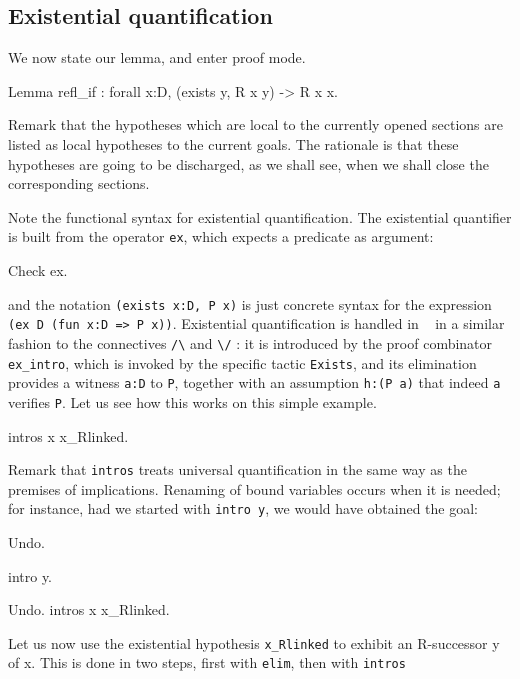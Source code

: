\documentclass[11pt,a4paper]{book}
\begin{document}
\subsection{Existential quantification}

We now state our lemma, and enter proof mode.
\begin{coq_example}
Lemma refl_if : forall x:D, (exists y, R x y) -> R x x.
\end{coq_example}

Remark that the hypotheses which are local to the currently opened sections
are listed as local hypotheses to the current goals.
The rationale is that these hypotheses are going to be discharged, as we
shall see, when we shall close the corresponding sections.

Note the functional syntax for existential quantification. The existential
quantifier is built from the operator \verb:ex:, which expects a 
predicate as argument:
\begin{coq_example}
Check ex.
\end{coq_example}
and the notation \verb+(exists x:D, P x)+ is just concrete syntax for 
the expression \verb+(ex D (fun x:D => P x))+. 
Existential quantification is handled in \Coq~ in a similar
fashion to the connectives \verb:/\: and \verb:\/: : it is introduced by
the proof combinator \verb:ex_intro:, which is invoked by the specific 
tactic \verb:Exists:, and its elimination provides a witness \verb+a:D+ to
\verb:P:, together with an assumption \verb+h:(P a)+ that indeed \verb+a+
verifies \verb:P:. Let us see how this works on this simple example.
\begin{coq_example}
intros x x_Rlinked.
\end{coq_example}

Remark that \verb:intros: treats universal quantification in the same way
as the premises of implications. Renaming of bound variables occurs
when it is needed; for instance, had we started with \verb:intro y:,
we would have obtained the goal:
\begin{coq_eval}
Undo.
\end{coq_eval}
\begin{coq_example}
intro y.
\end{coq_example}
\begin{coq_eval}
Undo.
intros x x_Rlinked.
\end{coq_eval}

Let us now use the existential hypothesis \verb:x_Rlinked: to 
exhibit an R-successor y of x. This is done in two steps, first with
\verb:elim:, then with \verb:intros:
\end{document}
